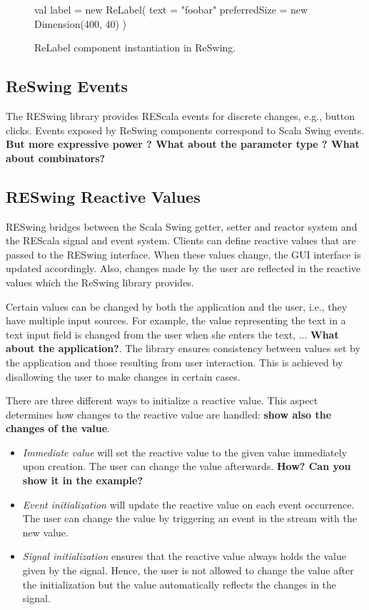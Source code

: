 \documentclass{scrartcl}
\begin{document}
\begin{figure}[htp]
\begin{codenv}
val label = new ReLabel(
    text = "foobar"
    preferredSize = new Dimension(400, 40)
)
\end{codenv}
\caption{ReLabel component instantiation in ReSwing.}
\label{lst:reswing-example}
\end{figure}


\subsection{ReSwing Events}
\label{sec:events}
The RESwing library provides REScala events for discrete changes,
e.g., button clicks. Events exposed by ReSwing components correspond
to Scala Swing events.  {\bf But more expressive power ? What about
  the parameter type ? What about combinators?}


\subsection{RESwing Reactive Values}
\label{sec:reactive-values}


RESwing bridges between the Scala Swing getter, setter and reactor
system and the REScala signal and event system. Clients can define
reactive values that are passed to the RESwing interface. When these
values change, the GUI interface is updated accordingly. Also, changes
made by the user are reflected in the reactive values which the
ReSwing library provides.

Certain values can be changed by both the application and the user,
i.e., they have multiple input sources. For example, the value
representing the text in a text input field is changed from the user
when she enters the text, ... {\bf What about the application?}. The
library ensures consistency between values set by the application and
those resulting from user interaction. This is achieved by disallowing
the user to make changes in certain cases.


There are three different ways to initialize a reactive value. This
aspect determines how changes to the reactive value are handled: {\bf
  show also the changes of the value}.

\begin{itemize}
\item \emph{Immediate value} will set the reactive value to the given
  value immediately upon creation. The user can change the value
  afterwards. {\bf How? Can you show it in the example?}
\item \emph{Event initialization} will update the reactive value on
  each event occurrence. The user can change the value by triggering
  an event in the stream with the new value.
\item \emph{Signal initialization} ensures that the reactive value
  always holds the value given by the signal. Hence, the user is not
  allowed to change the value after the initialization but the value
  automatically reflects the changes in the signal.
\end{itemize}
\end{document}
